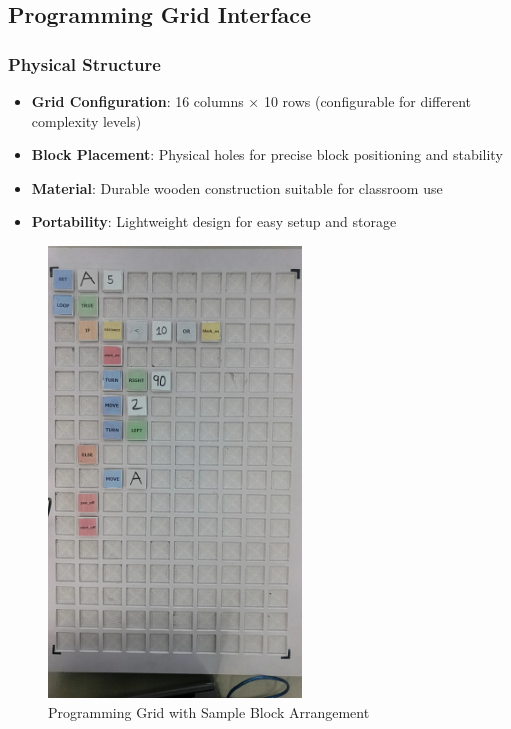 \subsection{Programming Grid Interface}

\subsubsection{Physical Structure}
\begin{itemize}
    \item \textbf{Grid Configuration}: 16 columns × 10 rows (configurable for different complexity levels)
    \item \textbf{Block Placement}: Physical holes for precise block positioning and stability
    \item \textbf{Material}: Durable wooden construction suitable for classroom use
    \item \textbf{Portability}: Lightweight design for easy setup and storage
\end{itemize}

\begin{figure}[H]
    \centering
    \includegraphics[width=0.6\textwidth]{assets/board.jpg}
    \caption{Programming Grid with Sample Block Arrangement}
    \label{fig:programming_grid}
\end{figure}

